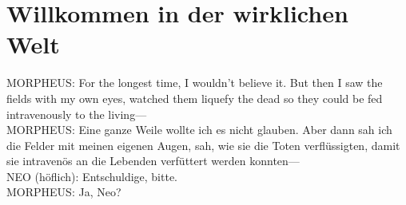 \section{Willkommen in der wirklichen Welt\protect\footnotemark}
\begin{playdialog}
MORPHEUS: For the longest time, I wouldn’t believe it. But then I saw the fields with my own eyes, watched them liquefy the dead so they could be fed intravenously to the living—\\
MORPHEUS: Eine ganze Weile wollte ich es nicht glauben. Aber dann sah ich die Felder mit meinen eigenen Augen, sah, wie sie die Toten verflüssigten, damit sie intravenös an die Lebenden verfüttert werden konnten—\\

NEO (höflich): Entschuldige, bitte.\\

MORPHEUS: Ja, Neo?\\


\end{playdialog}
